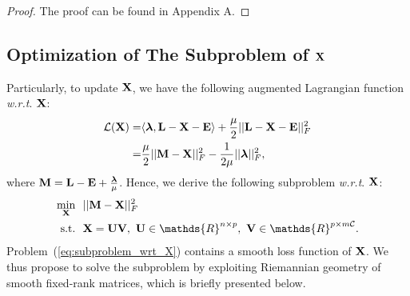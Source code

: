\documentclass[10pt,twocolumn,letterpaper]{article}
\def\bM{{\bf M}}
\def\bE{{\bf E}}
\def\blambda{{\bm \lambda}}
\def\calL{{\mathcal{L}}}
\def\calC{{\mathcal{C}}}
\def\bL{{\bf L}}
\def\bU{{\bf U}}
\def\bV{{\bf V}}
\def\dsR{\mathds{R}}
\def\bX{{\bf X}}
\def\bX{{\bf X}}
\def\st{{\text{s.t.}}}
\def\wrt{\emph{w.r.t}}
\begin{document}
\begin{proof}
\label{proof:proof_AA}
  The proof can be found in Appendix A.
\end{proof}


\subsection{Optimization of The Subproblem of $\bX$}

Particularly, to update $\bX$, we have the following augmented Lagrangian function \wrt. $\bX$:
{\small
\begin{align}\label{eq:langrangian_wrt_X}
  \calL (\bX) = & \langle \blambda, \bL - \bX - \bE \rangle + \frac{\mu}{2} || \bL - \bX - \bE ||_F^2  \nonumber  \\
              = & \frac{\mu}{2} || \bM - \bX ||_F^2 - \frac{1}{2\mu}|| \blambda ||_F^2   ,
\end{align}
}
\noindent
where $\bM = \bL - \bE + \frac{\blambda}{\mu}$.
Hence, we derive the following subproblem \wrt. $\bX$:
{\small
\begin{align}\label{eq:subproblem_wrt_X}
  \min_{\bX} ~&~ || \bM - \bX ||_F^2    \nonumber \\
  \st        ~&~ \bX = \bU \bV,~\bU \in \dsR^{n \times p},~\bV \in \dsR^{p \times m\calC}   .
\end{align}
}
\noindent
Problem~(\ref{eq:subproblem_wrt_X}) contains a smooth loss function of $\bX$.
We thus propose to solve the subproblem by exploiting Riemannian geometry of smooth fixed-rank matrices, which is briefly presented below.
\end{document}
